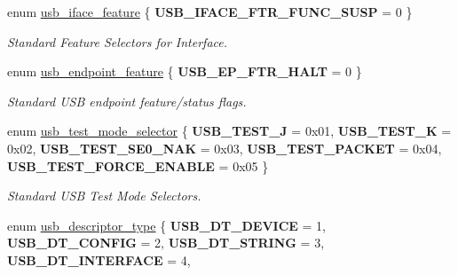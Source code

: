 \begin{DoxyCompactItemize}
enum \hyperlink{group__usb__protocol__group_gac9759075d928dc9e928d2dcce5d1102e}{usb\+\_\+iface\+\_\+feature} \{ {\bfseries U\+S\+B\+\_\+\+I\+F\+A\+C\+E\+\_\+\+F\+T\+R\+\_\+\+F\+U\+N\+C\+\_\+\+S\+U\+SP} = 0
 \}\begin{DoxyCompactList}\small\item\em Standard Feature Selectors for Interface. \end{DoxyCompactList}
\item 
\mbox{\label{group__usb__protocol__group_gac46bc23132eb03cefa56ba47024ced5d}} 
enum \hyperlink{group__usb__protocol__group_gac46bc23132eb03cefa56ba47024ced5d}{usb\+\_\+endpoint\+\_\+feature} \{ {\bfseries U\+S\+B\+\_\+\+E\+P\+\_\+\+F\+T\+R\+\_\+\+H\+A\+LT} = 0
 \}\begin{DoxyCompactList}\small\item\em Standard U\+SB endpoint feature/status flags. \end{DoxyCompactList}
\item 
\mbox{\label{group__usb__protocol__group_gade3fc5b71e88ed167a8c8d67ee087db3}} 
enum \hyperlink{group__usb__protocol__group_gade3fc5b71e88ed167a8c8d67ee087db3}{usb\+\_\+test\+\_\+mode\+\_\+selector} \{ \newline
{\bfseries U\+S\+B\+\_\+\+T\+E\+S\+T\+\_\+J} = 0x01, 
{\bfseries U\+S\+B\+\_\+\+T\+E\+S\+T\+\_\+K} = 0x02, 
{\bfseries U\+S\+B\+\_\+\+T\+E\+S\+T\+\_\+\+S\+E0\+\_\+\+N\+AK} = 0x03, 
{\bfseries U\+S\+B\+\_\+\+T\+E\+S\+T\+\_\+\+P\+A\+C\+K\+ET} = 0x04, 
\newline
{\bfseries U\+S\+B\+\_\+\+T\+E\+S\+T\+\_\+\+F\+O\+R\+C\+E\+\_\+\+E\+N\+A\+B\+LE} = 0x05
 \}\begin{DoxyCompactList}\small\item\em Standard U\+SB Test Mode Selectors. \end{DoxyCompactList}
\item 
\mbox{\label{group__usb__protocol__group_ga87d46dd117d939964c939f1518dec93f}} 
enum \hyperlink{group__usb__protocol__group_ga87d46dd117d939964c939f1518dec93f}{usb\+\_\+descriptor\+\_\+type} \{ \newline
{\bfseries U\+S\+B\+\_\+\+D\+T\+\_\+\+D\+E\+V\+I\+CE} = 1, 
{\bfseries U\+S\+B\+\_\+\+D\+T\+\_\+\+C\+O\+N\+F\+IG} = 2, 
{\bfseries U\+S\+B\+\_\+\+D\+T\+\_\+\+S\+T\+R\+I\+NG} = 3, 
{\bfseries U\+S\+B\+\_\+\+D\+T\+\_\+\+I\+N\+T\+E\+R\+F\+A\+CE} = 4, 

\end{DoxyCompactItemize}
